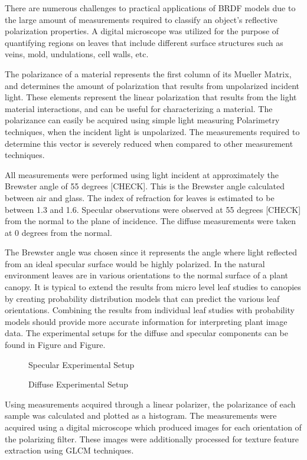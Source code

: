 There are numerous challenges to practical applications of BRDF models due to the large amount of measurements required to classify an object's reflective polarization properties.  A digital microscope was utilized for the purpose of quantifying regions on leaves that include different surface structures such as veins, mold, undulations, cell walls, etc.

The polarizance of a material represents the first column of its Mueller Matrix, and determines the amount of polarization that results from unpolarized incident light.  These elements represent the linear polarization that results from the light material interactions, and can be useful for characterizing a material.  The polarizance can easily be acquired using simple light measuring Polarimetry techniques, when the incident light is unpolarized.  The measurements required to determine this vector is severely reduced when compared to other measurement techniques.

All measurements were performed using light incident at approximately the Brewster angle of 55 degrees [CHECK]. This is the Brewster angle calculated between air and glass.  The index of refraction for leaves is estimated to be between 1.3 and 1.6. Specular observations were observed at 55 degrees [CHECK] from the normal to the plane of incidence.  The diffuse measurements were taken at 0 degrees from the normal.

The Brewster angle was chosen since it represents the angle where light reflected from an ideal specular surface would be highly polarized.  In the natural environment leaves are in various orientations to the normal surface of a plant canopy.  It is typical to extend the results from micro level leaf studies to canopies by creating probability distribution models that can predict the various leaf orientations.  Combining the results from individual leaf studies with probability models should provide more accurate information for interpreting plant image data. The experimental setups for the diffuse and specular components can be found in Figure and Figure.
%
\begin{figure}[!htb]
    \begin{center}
    \end{center}
    \caption{Specular Experimental Setup}
    \label{fig:Experiment}
\end{figure}
\begin{figure}[!htb]
    \begin{center}
    \end{center}
    \caption{Diffuse Experimental Setup}
    \label{fig:Experiment}
\end{figure}
%
Using measurements acquired through a linear polarizer, the polarizance of each sample was calculated and plotted as a histogram.  The measurements were acquired using a digital microscope which produced images for each orientation of the polarizing filter.  These images were additionally processed for texture feature extraction using GLCM techniques.

